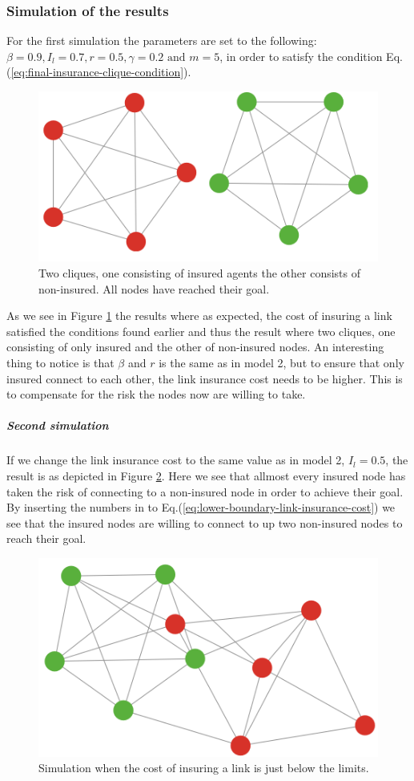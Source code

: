 \subsubsection{Simulation of the results}
For the first simulation the parameters are set to the following: $\beta=0.9, I_{l}=0.7, r=0.5, \gamma=0.2 \text{ and }m=5$, in order to satisfy the condition Eq.(\ref{eq:final-insurance-clique-condition}). 

\begin{figure}[h]
\centering
  \includegraphics[width=0.8\linewidth]{../Figures/BonusGameInsuredClique.png}
  \caption{\label{fig:bonusoptimal} Two cliques, one consisting of insured agents the other consists of non-insured. All nodes have reached their goal. }
\end{figure}
As we see in Figure \ref{fig:bonusoptimal} the results where as expected, the cost of insuring a link satisfied the conditions found earlier and thus the result where two cliques, one consisting of only insured and the other of non-insured nodes.
An interesting thing to notice is that $\beta$ and $r$ is the same as in model 2, but to ensure that only insured connect to each other, the link insurance cost needs to be higher. This is to compensate for the risk the nodes now are willing to take. 

\subparagraph{Second simulation}
If we change the link insurance cost to the same value as in model 2, $I_{l}=0.5$, the result is  as depicted in Figure \ref{fig:bonusviolating}. Here we see that allmost every insured node has taken the risk of connecting to a non-insured node in order to achieve their goal. By inserting the numbers in to Eq.(\ref{eq:lower-boundary-link-insurance-cost}) we see that the insured nodes are willing to connect to up two non-insured nodes to reach their goal.

\begin{figure}[h]
\centering
  \includegraphics[width=0.8\linewidth]{../Figures/BonusGameViolating.png}
  \caption{\label{fig:bonusviolating} Simulation when the cost of insuring a link is just below the limits. }
\end{figure}


